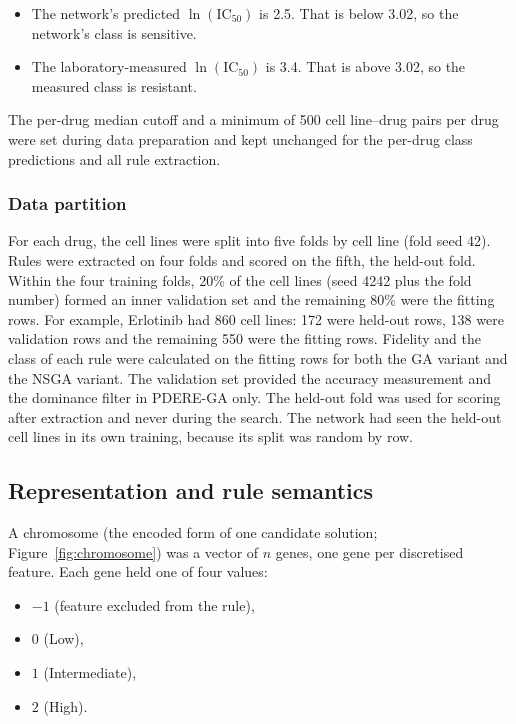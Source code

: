\begin{itemize}
  \item The network's predicted $\ln(\mathrm{IC}_{50})$ is 2.5. That is below 3.02, so the network's class is sensitive.
  \item The laboratory-measured $\ln(\mathrm{IC}_{50})$ is 3.4. That is above 3.02, so the measured class is resistant.
\end{itemize}

The per-drug median cutoff and a minimum of 500 cell line--drug pairs per drug were set during data preparation and kept unchanged for the per-drug class predictions and all rule extraction.

\subsubsection{Data partition}
\label{sec:partition}

For each drug, the cell lines were split into five folds by cell line (fold seed 42). Rules were extracted on four folds and scored on the fifth, the held-out fold. Within the four training folds, 20\% of the cell lines (seed 4242 plus the fold number) formed an inner validation set and the remaining 80\% were the fitting rows. For example, Erlotinib had 860 cell lines: 172 were held-out rows, 138 were validation rows and the remaining 550 were the fitting rows. Fidelity and the class of each rule were calculated on the fitting rows for both the GA variant and the NSGA variant. The validation set provided the accuracy measurement and the dominance filter in PDERE-GA only. The held-out fold was used for scoring after extraction and never during the search. The network had seen the held-out cell lines in its own training, because its split was random by row.

\subsection{Representation and rule semantics}
\label{sec:representation}

A chromosome (the encoded form of one candidate solution; Figure~\ref{fig:chromosome}) was a vector of $n$ genes, one gene per discretised feature. Each gene held one of four values:

\begin{itemize}
  \item $-1$ (feature excluded from the rule),
  \item $0$ (Low),
  \item $1$ (Intermediate),
  \item $2$ (High).
\end{itemize}

